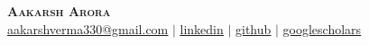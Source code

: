 \documentclass[letterpaper,11pt]{article}
\begin{document}

\begin{center}
    \textbf{\Huge \scshape Aakarsh Arora} \\ \vspace{1pt}
    \hypersetup{urlcolor=black} %
    \small \textbf{\faEnvelope} \href{mailto:aakarshverma330@gmail.com}{\underline{aakarshverma330@gmail.com}} $|$ 
    \textbf{\faLinkedinSquare} \href{https://www.linkedin.com/in/aakarsharora/}{\underline{linkedin}} $|$
    \textbf{\faGithub} \href{https://github.com/elaakarsh31}{\underline{github}} $|$
    \textbf{\faGraduationCap} \href{https://scholar.google.com/citations?user=zabMms8AAAAJ&hl=en}{\underline{googlescholars}}
    \hypersetup{urlcolor=blue} %
\end{center}



\end{document}
